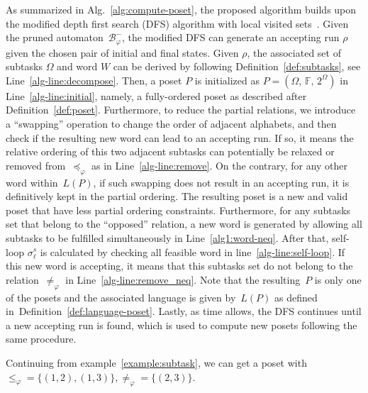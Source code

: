 As summarized in Alg.~\ref{alg:compute-poset},
the proposed algorithm builds upon the modified depth first search (DFS)
algorithm with local visited sets~\cite{sedgewick2001algorithms}.
Given the pruned automaton~$\mathcal{B}_{\varphi}^-$,
the modified DFS can generate an accepting run $\rho$ given the chosen pair of
initial and final states.
Given $\rho$, the associated set of subtasks $\Omega$ and word $W$ can be
derived by following Definition~\ref{def:subtasks}, see Line~\ref{alg-line:decompose}.
Then, a poset $P$ is initialized as $P=(\Omega,\, \mathbb{F},\, 2^{\Omega})$
in Line~\ref{alg-line:initial},
namely, a fully-ordered poset as described after Definition~\ref{def:poset}.
Furthermore, to reduce the partial relations,
we introduce a ``swapping'' operation to change the order of adjacent alphabets,
and then check if the resulting new word can lead to an accepting run.
If so, it means the relative ordering of this two adjacent subtasks can
potentially be relaxed or removed from~$\preceq_{\varphi}$ as in Line~\ref{alg-line:remove}.
On the contrary, for any other word within~$L(P)$, if such swapping does not
result in an accepting run, it is definitively kept in the partial ordering.
The resulting poset is a new and valid poset that have less partial
ordering constraints.
Furthermore, for any subtasks set that belong to the ``opposed'' relation,
a new word is generated by allowing all subtasks to be fulfilled simultaneously
in Line~\ref{alg1:word-neq}. After that, self-loop $\sigma^s_\ell$ is calculated
by checking all feasible word in line~\ref{alg-line:self-loop}.
If this new word is accepting, it means that this subtasks set do not belong to the
relation~$\neq_{\varphi}$ in Line~\ref{alg-line:remove_neq}.
Note that the resulting~$P$ is only one of the posets and the associated language is
given by~$L(P)$ as defined in~Definition~\ref{def:language-poset}.
Lastly, as time allows, the DFS continues until a new accepting run is found,
which is used to compute new posets following the same procedure.

\begin{example}
	Continuing from example~\ref{example:subtask}, we can get a poset with 
	$\leq_\varphi=\{(1,2),(1,3)\},\neq_{\varphi}=\{(2,3)\}$.
\end{example}

